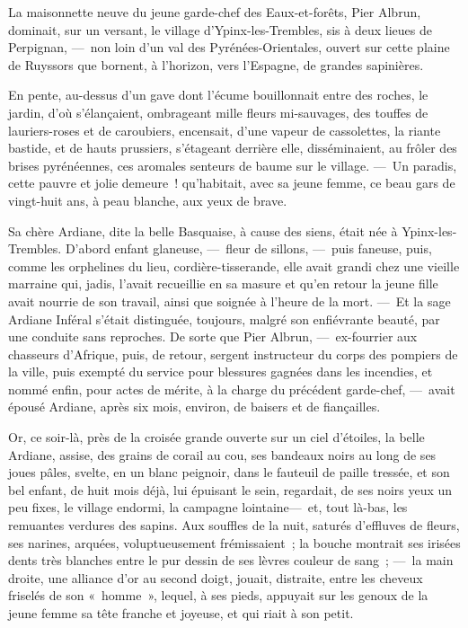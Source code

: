 \documentclass[french,twoside]{book} %
\newcommand{\bibl}[1]{{\RaggedLeft{#1}\par\bigskip}}
\begin{document}
\bibl{Jules {\scshape Barbey d’Aurevilly}.}
\noindent La maisonnette neuve du jeune garde-chef des Eaux-et-forêts, Pier Albrun, dominait, sur un versant, le village d’Ypinx-les-Trembles, sis à deux lieues de Perpignan, — non loin d’un val des Pyrénées-Orientales, ouvert sur cette plaine de Ruyssors que bornent, à l’horizon, vers l’Espagne, de grandes sapinières.\par
En pente, au-dessus d’un gave dont l’écume bouillonnait entre des roches, le jardin, d’où s’élançaient, ombrageant mille fleurs mi-sauvages,   des touffes de lauriers-roses et de caroubiers, encensait, d’une vapeur de cassolettes, la riante bastide, et de hauts prussiers, s’étageant derrière elle, disséminaient, au frôler des brises pyrénéennes, ces aromales senteurs de baume sur le village. — Un paradis, cette pauvre et jolie demeure ! qu’habitait, avec sa jeune femme, ce beau gars de vingt-huit ans, à peau blanche, aux yeux de brave.\par
Sa chère Ardiane, dite la belle Basquaise, à cause des siens, était née à Ypinx-les-Trembles. D’abord enfant glaneuse, — fleur de sillons, — puis faneuse, puis, comme les orphelines du lieu, cordière-tisserande, elle avait grandi chez une vieille marraine qui, jadis, l’avait recueillie en sa masure et qu’en retour la jeune fille avait nourrie de son travail, ainsi que soignée à l’heure de la mort. — Et la sage Ardiane Inféral s’était distinguée, toujours, malgré son enfiévrante beauté, par une conduite sans reproches. De sorte que Pier Albrun, — ex-fourrier aux chasseurs d’Afrique, puis, de retour, sergent instructeur du corps des pompiers de la ville, puis exempté   du service pour blessures gagnées dans les incendies, et nommé enfin, pour actes de mérite, à la charge du précédent garde-chef, — avait épousé Ardiane, après six mois, environ, de baisers et de fiançailles.\par
Or, ce soir-là, près de la croisée grande ouverte sur un ciel d’étoiles, la belle Ardiane, assise, des grains de corail au cou, ses bandeaux noirs au long de ses joues pâles, svelte, en un blanc peignoir, dans le fauteuil de paille tressée, et son bel enfant, de huit mois déjà, lui épuisant le sein, regardait, de ses noirs yeux un peu fixes, le village endormi, la campagne lointaine— et, tout là-bas, les remuantes verdures des sapins. Aux souffles de la nuit, saturés d’effluves de fleurs, ses narines, arquées, voluptueusement frémissaient ; la bouche montrait ses irisées dents très blanches entre le pur dessin de ses lèvres couleur de sang ; — la main droite, une alliance d’or au second doigt, jouait, distraite, entre les cheveux friselés de son « homme », lequel, à ses pieds, appuyait sur les genoux de la jeune femme sa tête franche et joyeuse, et qui riait à son petit.\par
\end{document}
